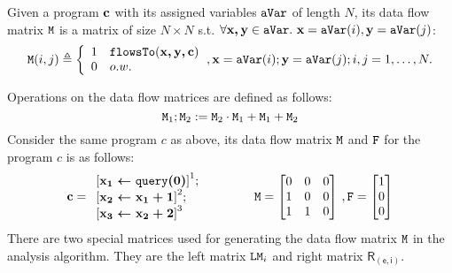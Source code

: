 \documentclass[a4paper,11pt]{article}
\begin{document}
%
%
\begin{defn}
Given a program  ${\boldsymbol{\mathbf{c}}}$ with its assigned variables $\mathtt{aVar}$ of length $N$,
its data flow matrix $\mathtt{M}$ is a matrix of size $N \times N$ s.t.
$\forall {\boldsymbol{\mathbf{x, y}}} \in \mathtt{aVar}. ~ {\boldsymbol{\mathbf{x}}} = \mathtt{aVar}(i), {\boldsymbol{\mathbf{y}}} = \mathtt{aVar}(j)$:
%
\[
\Mtrix(i, j) \triangleq
\left\{
\begin{array}{ll}
1	&	\flowsto(\ssa{x, y, c}) \\
0	& o.w.
\end{array}
\right.,
\ssa{x} = \avar(i); \ssa{y} = \avar(j); i, j = 1, \ldots, N .
\]
%
\end{defn}
%
Operations on the data flow matrices are defined as follows:
%
\begin{equation}
\mathtt{M}_1 ; \mathtt{M}_2 
:= \mathtt{M}_2 \cdot \mathtt{M}_1 + \mathtt{M}_1 + \mathtt{M}_2
\end{equation}
%
Consider the same program $c$ as above, its data flow matrix $\mathtt{M}$ and $\mathtt{F}$ for the program $c$ is as follows:
$$
\ssa{c} = 
\begin{array}{l}
\left[\ssa{\assign {x_1} {\query(0)}}	\right]^1;
\\
\left[\ssa{\assign {x_2} {x_1 + 1}}		\right]^2;
\\
\left[\ssa{\assign {x_3} {x_2 + 2}}		\right]^3
\end{array}
~~~~~~~~~~~~
\Mtrix
=  \left[ 
\begin{matrix}
 0 & 0 & 0 \\
 1 & 0 & 0 \\
 1 & 1 & 0 \\
\end{matrix} \right] ~ , 
\flag = \left [ \begin{matrix}
1 \\
0 \\
0 \\
\end{matrix} \right ]
$$
%
There are two special matrices used for generating the data flow matrix $\mathtt{M}$ in the analysis algorithm. They are the left matrix $\mathtt{LM}_i$ and right matrix $\mathsf{R_{(e, i)}}$.
\end{document}
